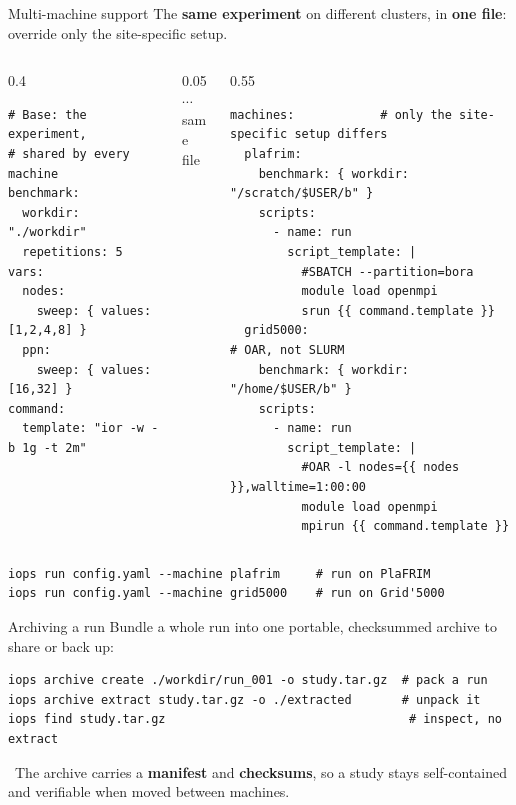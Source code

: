 \documentclass[aspectratio=169,11pt]{beamer}
\newcommand{\hl}[1]{{\color{iopsPink}\bfseries #1}}
\begin{document}
\begin{frame}[fragile]{Multi-machine support}
  The \hl{same experiment} on different clusters, in \hl{one file}: override only
  the site-specific setup.
  \begin{columns}[c]
    \begin{column}{0.4\textwidth}
\begin{lstlisting}[style=yaml,basicstyle=\ttfamily\fontsize{6.4}{7.6}\selectfont,columns=fixed]
# Base: the experiment,
# shared by every machine
benchmark:
  workdir: "./workdir"
  repetitions: 5
vars:
  nodes:
    sweep: { values: [1,2,4,8] }
  ppn:
    sweep: { values: [16,32] }
command:
  template: "ior -w -b 1g -t 2m"
\end{lstlisting}
    \end{column}
    \begin{column}{0.05\textwidth}
      \centering
      {\Large\color{iopsBlue}$\cdots$}\\[2pt]
      {\tiny\color{iopsGrey}same\\file}
    \end{column}
    \begin{column}{0.55\textwidth}
\begin{lstlisting}[style=yaml,basicstyle=\ttfamily\fontsize{6.3}{7.6}\selectfont,columns=fixed]
machines:            # only the site-specific setup differs
  plafrim:
    benchmark: { workdir: "/scratch/$USER/b" }
    scripts:
      - name: run
        script_template: |
          #SBATCH --partition=bora
          module load openmpi
          srun {{ command.template }}
  grid5000:                            # OAR, not SLURM
    benchmark: { workdir: "/home/$USER/b" }
    scripts:
      - name: run
        script_template: |
          #OAR -l nodes={{ nodes }},walltime=1:00:00
          module load openmpi
          mpirun {{ command.template }}
\end{lstlisting}
    \end{column}
  \end{columns}
\begin{lstlisting}[style=sh,basicstyle=\ttfamily\scriptsize]
iops run config.yaml --machine plafrim     # run on PlaFRIM
iops run config.yaml --machine grid5000    # run on Grid'5000
\end{lstlisting}
\end{frame}

\begin{frame}[fragile]{Archiving a run}
  Bundle a whole run into one portable, checksummed archive to share or back up:
\begin{lstlisting}[style=sh]
iops archive create ./workdir/run_001 -o study.tar.gz  # pack a run
iops archive extract study.tar.gz -o ./extracted       # unpack it
iops find study.tar.gz                                  # inspect, no extract
\end{lstlisting}
  \begin{keybox}
    \faBoxOpen~The archive carries a \hl{manifest} and \hl{checksums}, so a study
    stays self-contained and verifiable when moved between machines.
  \end{keybox}
\end{frame}
\end{document}
